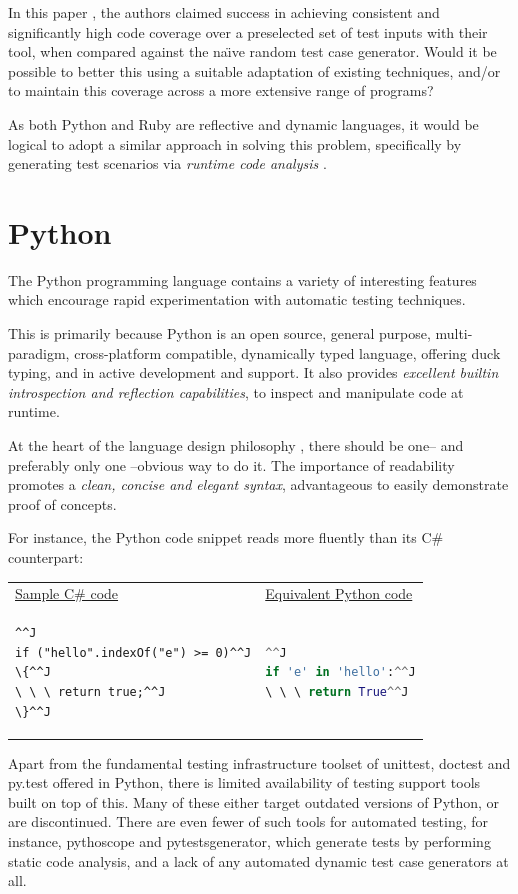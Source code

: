 \documentclass{icldt}
\numberwithin{equation}{section}       %
\def\naive{na\"{\i}ve }
\begin{document}
In this paper \cite{Mairhofer2011}, the authors claimed success in achieving consistent and significantly high code coverage over a preselected set of test inputs with their tool, when compared against the \naive random test case generator. Would it be possible to better this using a suitable adaptation of existing techniques, and/or to maintain this coverage across a more extensive range of programs?

As both Python and Ruby are reflective and dynamic languages, it would be logical to adopt a similar approach in solving this problem, specifically by generating test scenarios via \emph{runtime code analysis} \cite{Mairhofer2011}.
\section{Python}
The Python programming language contains a variety of interesting features which encourage rapid experimentation with automatic testing techniques.

This is primarily because Python is an open source, general purpose, multi-paradigm, cross-platform compatible, dynamically typed language, offering duck typing, and in active development and support. It also provides \emph{excellent builtin introspection and reflection capabilities}, to inspect and manipulate code at runtime.

At the heart of the language design philosophy \cite{Pep20ZenPython}, there should be one-- and preferably only one --obvious way to do it. The importance of readability promotes a \emph{clean, concise and elegant syntax}, advantageous to easily demonstrate proof of concepts.

For instance, the Python code snippet reads more fluently than its C\# counterpart:

\begin{tabularx}{\textwidth}{X X}
\underline{Sample C\# code} & \underline{Equivalent Python code} \\
\begin{lstlisting}[language=CSharp]^^J
if ("hello".indexOf("e") >= 0)^^J
\{^^J
\ \ \ return true;^^J
\}^^J
\end{lstlisting}
&
\begin{lstlisting}[language=python]^^J
if 'e' in 'hello':^^J
\ \ \ return True^^J
\end{lstlisting}
\end{tabularx}
Apart from the fundamental testing infrastructure toolset of \textsf{unittest}, \textsf{doctest} and \textsf{py.test} offered in Python, there is limited availability of testing support tools built on top of this. Many of these either target outdated versions of Python, or are discontinued. There are even fewer of such tools for automated testing, for instance, \textsf{pythoscope} and \textsf{pytestsgenerator}, which generate tests by performing static code analysis, and a lack of any automated dynamic test case generators at all.
\end{document}
